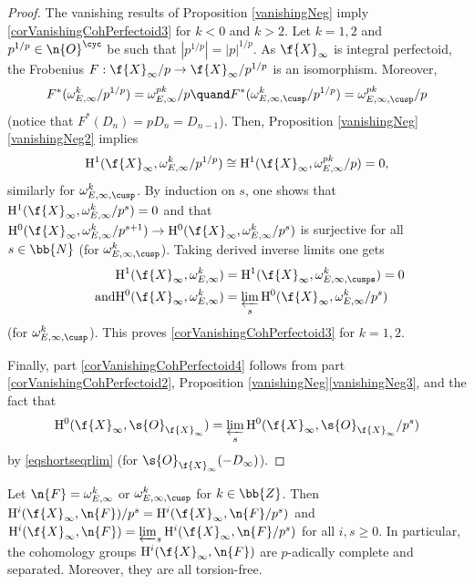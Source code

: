 \begin{proof}
The vanishing results of Proposition \ref{vanishingNeg} imply \eqref{corVanishingCohPerfectoid3} for $k<0$ and $k>2$. Let $k=1,2$ and $p^{1/p}\in \n{O}^{\cyc}$ be such that $|p^{1/p}|=|p|^{1/p}$. As $\f{X}_{\infty}$ is integral perfectoid, the Frobenius $F:\f{X}_{\infty}/p\to \f{X}_{\infty}/p^{1/p}$ is an isomorphism. Moreover,
\[
F^*(\omega_{E,\infty}^{k}/p^{1/p})=\omega_{E,\infty}^{pk}/p\quand F^*(\omega_{E,\infty,\cusp}^k/p^{1/p})=\omega_{E,\infty,\cusp}^{pk}/p
\]
(notice that $F^*(D_n)=pD_n= D_{n-1}$). Then, Proposition \ref{vanishingNeg}\eqref{vanishingNeg2} implies
\begin{equation}
\label{vanishingperfint}
\mathrm{H}^1(\f{X}_{\infty}, \omega^k_{E,\infty}/p^{1/p})\cong \mathrm{H}^1(\f{X}_{\infty}, \omega^{pk}_{E,\infty}/p)=0,
\end{equation}
similarly for $\omega^{k}_{E,\infty,\cusp}$. By induction on $s$, one shows that $\mathrm{H}^1(\f{X}_{\infty}, \omega_{E,\infty}^k/p^s)=0$ and that $\mathrm{H}^0(\f{X}_{\infty}, \omega^k_{E,\infty}/p^{s+1})\to \mathrm{H}^0(\f{X}_{\infty}, \omega^k_{E,\infty}/p^s)$ is surjective for all $s\in \bb{N}$ (\resp for $\omega_{E,\infty,\cusp}^{k}$). Taking derived inverse limits one gets
\begin{align*}
\mathrm{H}^1(\f{X}_{\infty}, \omega_{E,\infty}^k)&=\mathrm{H}^1(\f{X}_{\infty}, \omega_{E,\infty,\cusps}^k)=0\\
\tag*{and}
\mathrm{H}^0(\f{X}_{\infty}, \omega^k_{E,\infty})&= \varprojlim_s \mathrm{H}^0(\f{X}_{\infty}, \omega^k_{E,\infty}/p^s)
\end{align*}
(\resp for $\omega^k_{E,\infty, \cusp}$). This proves \eqref{corVanishingCohPerfectoid3} for $k=1,2$.

Finally, part \eqref{corVanishingCohPerfectoid4} follows from part \eqref{corVanishingCohPerfectoid2}, Proposition \ref{vanishingNeg}\eqref{vanishingNeg3}, and the fact that
\[\mathrm{H}^0(\f{X}_{\infty}, \s{O}_{\f{X}_\infty})= \varprojlim_s \mathrm{H}^0(\f{X}_{\infty}, \s{O}_{\f{X}_\infty}/p^s)\]
by \eqref{eqshortseqrlim} (\resp for $\s{O}_{\f{X}_{\infty}}(-D_{\infty})$).
\end{proof}

\begin{cor}
\label{CoroHiTorsionfree}
Let $\n{F}=\omega^k_{E,\infty}$ or $\omega^k_{E,\infty,\cusp}$ for $k\in \bb{Z}$. Then $\mathrm{H}^i(\f{X}_{\infty}, \n{F})/p^s= \mathrm{H}^i(\f{X}_{\infty}, \n{F}/p^s)$ and $ \mathrm{H}^i(\f{X}_{\infty}, \n{F})=\varprojlim_s \mathrm{H}^i(\f{X}_{\infty}, \n{F} /p^s)$ for all $i,s\geq 0$. In particular, the cohomology groups $ \mathrm{H}^i(\f{X}_{\infty}, \n{F})$ are $p$-adically complete and separated. Moreover, they are all torsion-free.
\end{cor}

